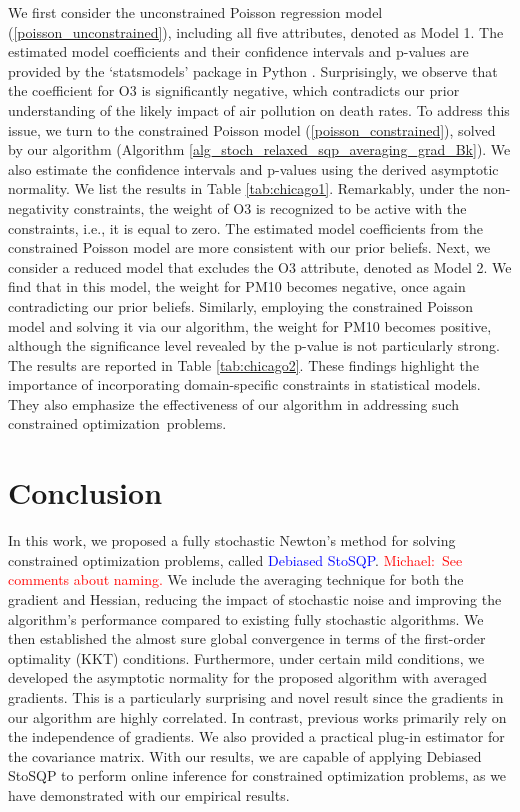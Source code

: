 \documentclass[aos]{imsart}
\numberwithin{equation}{section}
\theoremstyle{plain}
\newcommand{\michael}[1]{\textcolor{red}{Michael:\ #1}}
\begin{document}
We first consider the unconstrained Poisson regression model (\ref{poisson_unconstrained}), including all five attributes, denoted as Model 1. The estimated model coefficients and their confidence intervals and p-values are provided by the `statsmodels' package in Python \cite{seabold2010statsmodels}. Surprisingly, we observe that the coefficient for O3 is significantly negative, which contradicts our prior understanding of the likely impact of air pollution on death rates. To address this issue, we turn to the constrained Poisson model (\ref{poisson_constrained}), solved by our algorithm (Algorithm \ref{alg_stoch_relaxed_sqp_averaging_grad_Bk}). We also estimate the confidence intervals and p-values using the derived asymptotic normality. We list the results in Table \ref{tab:chicago1}. Remarkably, under the non-negativity constraints, the weight of O3 is recognized to be active with the constraints, i.e., it is equal to zero. The estimated model coefficients from the constrained Poisson model are more consistent with our prior beliefs. Next, we consider a reduced model that excludes the O3 attribute, denoted as Model 2. We find that in this model, the weight for PM10 becomes negative, once again contradicting our prior beliefs.
Similarly, employing the constrained Poisson model and solving it via our algorithm, the weight for PM10 becomes positive, although the significance level revealed by the p-value is not particularly strong. The results are reported in Table \ref{tab:chicago2}. 
These findings highlight the importance of incorporating domain-specific constraints in statistical models. They also emphasize the effectiveness of our algorithm in addressing such constrained optimization~problems.


\section{Conclusion}
In this work, we proposed a fully stochastic Newton's method for solving constrained optimization problems, called \textcolor{blue}{Debiased StoSQP}. 
\michael{See comments about naming.}
We include the averaging technique for both the gradient and Hessian, reducing the impact of stochastic noise and improving the algorithm's performance compared to existing fully stochastic algorithms. 
We then established the almost sure global convergence in terms of the first-order optimality (KKT) conditions. 
Furthermore, under certain mild conditions, we developed the asymptotic normality for the proposed algorithm with averaged gradients. 
This is a particularly surprising and novel result since the gradients in our algorithm are highly correlated. 
In contrast, previous works primarily rely on the independence of gradients. 
We also provided a practical plug-in estimator for the covariance matrix. 
With our results, we are capable of applying Debiased StoSQP to perform online inference for constrained optimization problems, as we have demonstrated with our empirical results. 
\end{document}
